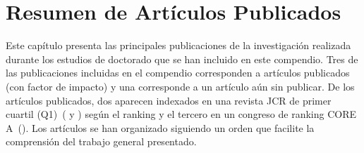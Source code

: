 \chapter{Resumen de Artículos Publicados}\label{Chap:SummaryPapers}

Este capítulo presenta las principales publicaciones de la investigación realizada durante los estudios de doctorado que se han incluido en este compendio.
Tres de las publicaciones incluidas en el compendio corresponden a artículos publicados (con factor de impacto) y una corresponde a un artículo aún sin publicar. De los artículos publicados, dos aparecen indexados en una revista JCR de primer cuartil (Q1)~(\citet{piad2019corpus} y \citet{piad2020computational}) según el ranking y el tercero en un congreso de ranking CORE A~(\citet{piad2019general}).
Los artículos se han organizado siguiendo un orden que facilite la comprensión del trabajo general presentado.
